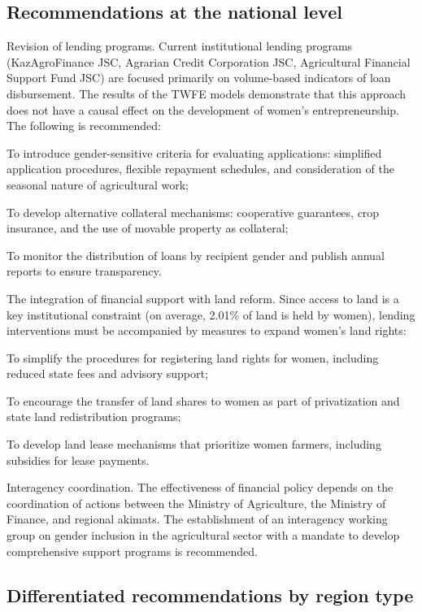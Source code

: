 ﻿\documentclass[pdflatex,sn-mathphys-ay]{sn-jnl}
\begin{document}
\subsection{Recommendations at the national level}

Revision of lending programs. Current institutional lending programs
(KazAgroFinance JSC, Agrarian Credit Corporation JSC, Agricultural
Financial Support Fund JSC) are focused primarily on volume-based
indicators of loan disbursement. The results of the TWFE models demonstrate
that this approach does not have a causal effect on the development of
women's entrepreneurship. The following is recommended:

To introduce gender-sensitive criteria for evaluating applications:
simplified application procedures, flexible repayment schedules, and
consideration of the seasonal nature of agricultural work;

To develop alternative collateral mechanisms: cooperative guarantees,
crop insurance, and the use of movable property as collateral;

To monitor the distribution of loans by recipient gender and publish
annual reports to ensure transparency.

The integration of financial support with land reform. Since access to
land is a key institutional constraint (on average, 2.01\% of land is
held by women), lending interventions must be accompanied by measures to
expand women's land rights:

To simplify the procedures for registering land rights for women,
including reduced state fees and advisory support;

To encourage the transfer of land shares to women as part of
privatization and state land redistribution programs;

To develop land lease mechanisms that prioritize women farmers,
including subsidies for lease payments.

Interagency coordination. The effectiveness of financial policy depends
on the coordination of actions between the Ministry of Agriculture, the
Ministry of Finance, and regional akimats. The establishment of an
interagency working group on gender inclusion in the agricultural sector
with a mandate to develop comprehensive support programs is recommended.

\subsection{Differentiated recommendations by region type}
\end{document}
